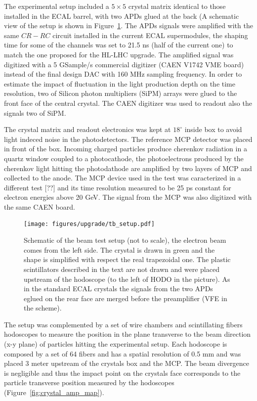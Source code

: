 The experimental setup included a $5\times 5$ \PbWO crystal matrix identical to those installed in the ECAL barrel,
with two APDs glued at the back (A schematic view of the setup is shown in Figure~\ref{fig:tb_setup}.
The APDs signals were amplified with the same $CR-RC$ circuit installed in the current ECAL
supermodules, the shaping time for some of the channels was set to 21.5 ns (half of the current one) to match the
one proposed for the HL-LHC upgrade.
The amplified signal was digitized with a 5 GSample/s commercial digitizer (CAEN V1742 VME board)
instead of the final design
DAC with 160 MHz sampling frequency.
In order to estimate the impact of fluctuation in the light production depth on the time resolution,
two of Silicon photon multipliers (SiPM) arrays were glued to the front face of the central crystal.
The CAEN digitizer was used to readout also the signals two of SiPM.

The crystal matrix and readout electronics was kept at $18^{\circ}$ inside box to avoid
light indeced noise in the photodetectors. The reference MCP detector was placed in front of the box. 
Incoming charged particles produce cherenkov radiation in a quartz window coupled to a photocathode,
the photoelectrons produced by the cherenkov light hitting
the photodathode are amplified by two layers of MCP and collected to the anode. 
The MCP device used in the test was caracterized 
in a different test [??] and its time resolution measured to be 25 ps constant for electron energies
above 20 GeV. The signal from the MCP was also digitized with the same CAEN board.

\begin{figure}[h!]
  \centering
  \texttt{[image: figures/upgrade/tb\_setup.pdf]}
  \caption{Schematic of the beam test setup (not to scale), the electron beam comes from the left side.
    The \PbWO crystal is drawn in green and the shape is simplified with
    respect the real trapezoidal one. The plastic scintillators described in the text are not drawn and were placed
    upstream of the hodoscope (to the left of HODO in the picture). As in the standard ECAL crystals the signals from the two APDs
    eglued on the rear face are merged before the preamplifier (VFE in the scheme).}
  \label{fig:tb_setup}
\end{figure}
  
The setup was complemented by a set of wire chambers and scintillating fibers hodoscopes to measure the position in the plane
transverse to the beam direction (x-y plane) of particles hitting the experimental setup.
Each hodoscope is composed by a set of 64 fibers and has a spatial resolution of 0.5 mm and was placed
3 meter upstream of the crystals box and the MCP. The beam divergence is negligible and thus the impact point on the crystals
face corresponds to the particle transverse position measured by the hodoscopes (Figure~\ref{fig:crystal_amp_map}).


